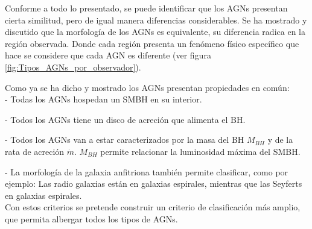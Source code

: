 Conforme a todo lo presentado, se puede identificar que los AGNs presentan cierta similitud, pero de igual manera diferencias considerables. Se ha mostrado y discutido que la morfología de los AGNs es equivalente, su diferencia radica en la región observada. Donde cada región presenta un fenómeno físico específico que hace se considere que cada AGN es diferente
(ver figura \ref{fig:Tipos_AGNs_por_observador}).

Como ya se ha dicho y mostrado los AGNs presentan propiedades en común: \\

- Todas los AGNs hospedan un SMBH en su interior. 

- Todos los AGNs tiene un disco de acreción que alimenta el BH.

- Todos los AGNs van a estar caracterizados por la masa del BH $M_{BH}$ y de la rata de acreción $\dot{m}$. $M_{BH}$ permite relacionar la luminosidad máxima del SMBH. 

- La morfología de la galaxia anfitriona también permite clasificar, como por ejemplo: Las radio galaxias están en galaxias espirales, mientras que las Seyferts en galaxias espirales.\\

Con estos criterios se pretende construir un criterio de clasificación más amplio, que permita albergar todos los tipos de AGNs.





